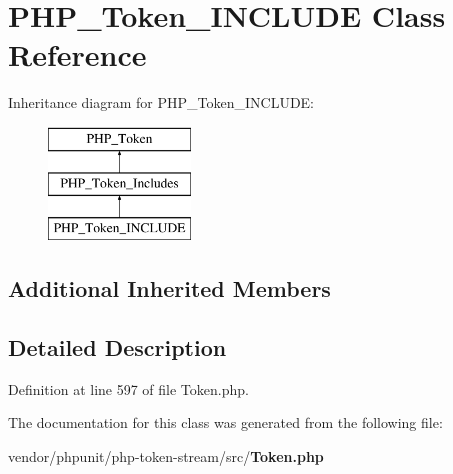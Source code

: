 \section{P\+H\+P\+\_\+\+Token\+\_\+\+I\+N\+C\+L\+U\+D\+E Class Reference}
\label{class_p_h_p___token___i_n_c_l_u_d_e}
Inheritance diagram for P\+H\+P\+\_\+\+Token\+\_\+\+I\+N\+C\+L\+U\+D\+E\+:\begin{figure}[H]
\begin{center}
\leavevmode
\includegraphics[height=3.000000cm]{class_p_h_p___token___i_n_c_l_u_d_e}
\end{center}
\end{figure}
\subsection*{Additional Inherited Members}


\subsection{Detailed Description}


Definition at line 597 of file Token.\+php.



The documentation for this class was generated from the following file\+:\begin{DoxyCompactItemize}
\item 
vendor/phpunit/php-\/token-\/stream/src/{\bf Token.\+php}\end{DoxyCompactItemize}
